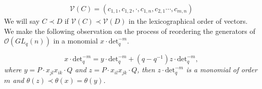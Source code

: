 \documentclass[table,a4paper,reqno]{amsart}
\numberwithin{equation}{section}
\theoremstyle{definition}
\begin{document}
\begin{align*}
    \mathcal{V}(C)=(c_{1,1},c_{1,2},\cdot,c_{1,n},c_{2,1}\cdots,c_{m,n})
\end{align*}
We will say $C\prec D$ if $\mathcal{V}(C)\prec\mathcal{V}(D)$ in the lexicographical order of vectors. We make the following observation on the process of reordering the generators of $\mathcal{O}(GL_q(n))$ in a monomial $x\cdot\text{det}_q^{-m}$. 

\hfill

\begin{equation*}
    x\cdot\text{det}_q^{-m}=y\cdot\text{det}_q^{-m}+(q-q^{-1})z\cdot\text{det}_q^{-m},
\end{equation*}
{\it where $y=P\cdot x_{jl}x_{ik}\cdot Q$ and $z=P\cdot x_{il}x_{jk}\cdot Q$, then $z\cdot\text{det}_q^{-m}$ is a monomial of order $m$ and $\theta(z)\prec\theta(x)=\theta(y)$.}

\hfill
\end{document}
